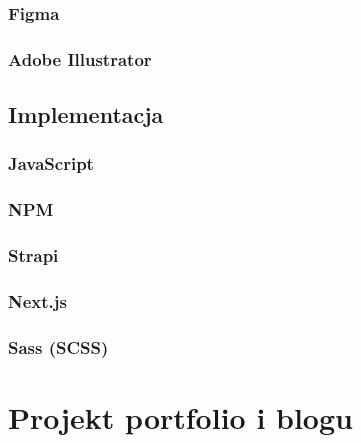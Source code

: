 \documentclass[12pt]{article}
\numberwithin{figure}{section}
\begin{document}
\begin{sloppypar}

\subsubsection{Figma}


\subsubsection{Adobe Illustrator}


\subsection{Implementacja}


\subsubsection{JavaScript}


\subsubsection{NPM}


\subsubsection{Strapi}


\subsubsection{Next.js}


\subsubsection{Sass (SCSS)}


\newpage 

\section{Projekt portfolio i blogu}


\end{sloppypar}
\end{document}
